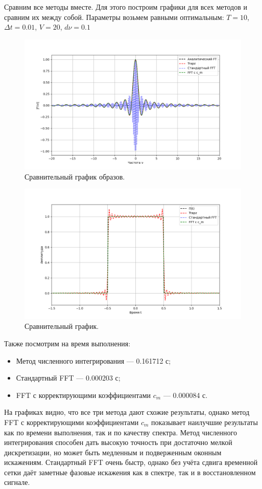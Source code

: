 \documentclass[a4paper]{article}
\begin{document}
Сравним все методы вместе. Для этого построим графики для всех методов и сравним их между собой. Параметры возьмем равными оптимальным:  \(T=10\), \(\Delta t=0.01\), \(V=20\), \(d\nu=0.1\)

\begin{figure}[H]
  \centering
  \includegraphics[width=\textwidth]{src/task_1_4/comp_freq.png}
  \caption{Сравнительный график образов.} 
\end{figure}
\begin{figure}[H]
  \centering
  \includegraphics[width=\textwidth]{src/task_1_4/comp_time.png}
  \caption{Сравнительный график.} 
\end{figure}

Также посмотрим на время выполнения:
\begin{itemize}
  \item Метод численного интегрирования --- 0.161712 с;
  \item Стандартный FFT --- 0.000203 с;
  \item FFT с корректирующими коэффициентами \(c_m\) --- 0.000084 с. 
\end{itemize}
\noindent На графиках видно, что все три метода дают схожие результаты, однако метод FFT с корректирующими коэффициентами \(c_m\) показывает наилучшие результаты как по времени выполнения, так и по качеству спектра. Метод численного интегрирования способен дать высокую точность при достаточно мелкой дискретизации, но может быть медленным и подверженным оконным искажениям. Стандартный FFT очень быстр, однако без учёта сдвига временной сетки даёт заметные фазовые искажения как в спектре, так и в восстановленном сигнале.
\end{document}

